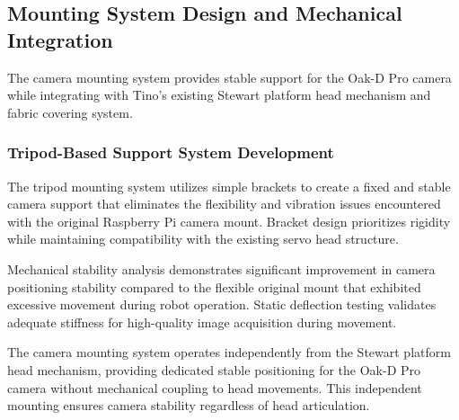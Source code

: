 \subsection{Mounting System Design and Mechanical Integration}

The camera mounting system provides stable support for the Oak-D Pro camera while integrating with Tino's existing Stewart platform head mechanism and fabric covering system.

\subsubsection{Tripod-Based Support System Development}

The tripod mounting system utilizes simple brackets to create a fixed and stable camera support that eliminates the flexibility and vibration issues encountered with the original Raspberry Pi camera mount. Bracket design prioritizes rigidity while maintaining compatibility with the existing servo head structure.

Mechanical stability analysis demonstrates significant improvement in camera positioning stability compared to the flexible original mount that exhibited excessive movement during robot operation. Static deflection testing validates adequate stiffness for high-quality image acquisition during movement.

The camera mounting system operates independently from the Stewart platform head mechanism, providing dedicated stable positioning for the Oak-D Pro camera without mechanical coupling to head movements. This independent mounting ensures camera stability regardless of head articulation.

